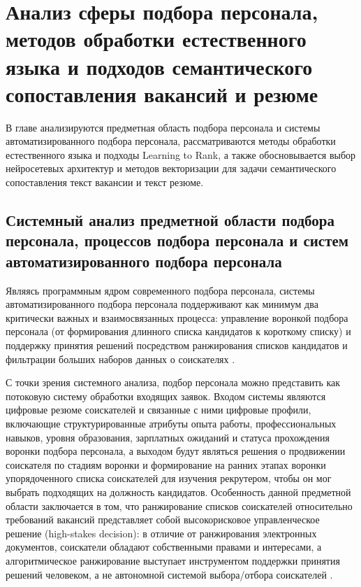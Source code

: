 \chapter{Анализ сферы подбора персонала, методов обработки естественного языка и подходов семантического сопоставления вакансий и резюме}
\label{chapter:analysis}

В главе анализируются предметная область подбора персонала и системы автоматизированного подбора персонала, рассматриваются методы обработки естественного языка и подходы Learning to Rank, а также обосновывается выбор нейросетевых архитектур и методов векторизации для задачи семантического сопоставления текст вакансии и текст резюме.
\section{Системный анализ предметной области подбора персонала, процессов подбора персонала и систем автоматизированного подбора персонала}

Являясь программным ядром современного подбора персонала, системы автоматизированного подбора персонала поддерживают как минимум два критически важных и взаимосвязанных процесса: управление воронкой подбора персонала (от формирования длинного списка кандидатов к короткому списку) и поддержку принятия решений посредством ранжирования списков кандидатов и фильтрации больших наборов данных о соискателях \cite{src02}.

С точки зрения системного анализа, подбор персонала можно представить как потоковую систему обработки входящих заявок. Входом системы являются цифровые резюме соискателей и связанные с ними цифровые профили, включающие структурированные атрибуты опыта работы, профессиональных навыков, уровня образования, зарплатных ожиданий и статуса прохождения воронки подбора персонала, а выходом будут являться решения о продвижении соискателя по стадиям воронки и формирование на ранних этапах воронки упорядоченного списка соискателей для изучения рекрутером, чтобы он мог выбрать подходящих на должность кандидатов. Особенность данной предметной области заключается в том, что ранжирование списков соискателей относительно требований вакансий представляет собой высокорисковое управленческое решение (high-stakes decision): в отличие от ранжирования электронных документов, соискатели обладают собственными правами и интересами, а алгоритмическое ранжирование выступает инструментом поддержки принятия решений человеком, а не автономной системой выбора/отбора соискателей \cite{src02}.

